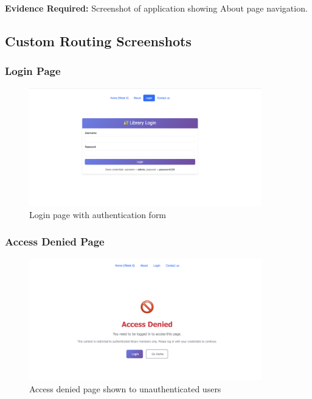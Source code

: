 \documentclass[11pt,a4paper]{article}
\begin{document}
\textbf{Evidence Required:} Screenshot of application showing About page navigation.

\newpage

\subsection{Custom Routing Screenshots}

\subsubsection{Login Page}

 \begin{figure}[h]
     \centering
     \includegraphics[width=0.9\textwidth]{login_page.png}
     \caption{Login page with authentication form}
     \label{fig:login_page}
\end{figure}

\subsubsection{Access Denied Page}

 \begin{figure}[h]
     \centering
     \includegraphics[width=0.9\textwidth]{access_denied_page.png}
     \caption{Access denied page shown to unauthenticated users}
     \label{fig:access_denied}
\end{figure}
\end{document}
